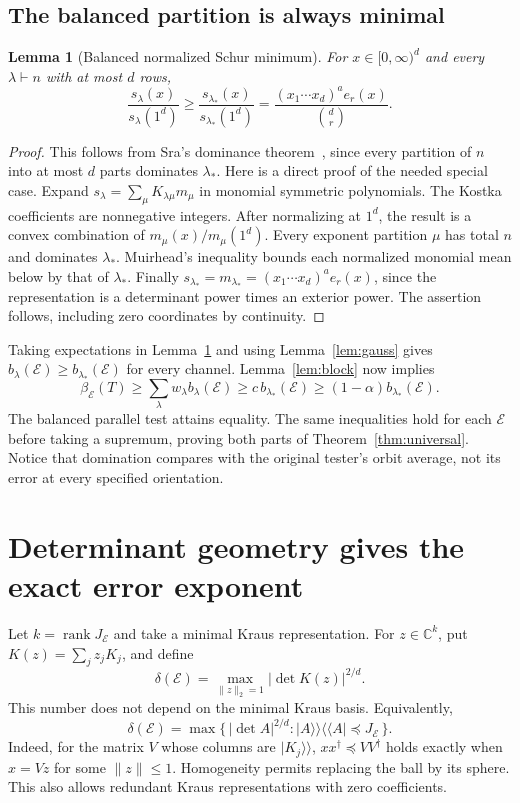 \documentclass[11pt,a4paper]{article}
\newtheorem{lemma}[theorem]{Lemma}
\theoremstyle{remark}\newtheorem{remark}[theorem]{Remark}
\DeclareMathOperator{\rank}{rank}
\newcommand{\E}{\mathcal E}
\newcommand{\CC}{\mathbb C}
\newcommand{\vket}[1]{\lvert #1\rangle\!\rangle}
\newcommand{\vbra}[1]{\langle\!\langle #1\rvert}
\newcommand{\bal}{\lambda_*}
\begin{document}
\subsection{The balanced partition is always minimal}
\begin{lemma}[Balanced normalized Schur minimum]\label{lem:balanced}
For $x\in[0,\infty)^d$ and every $\lambda\vdash n$ with at most $d$ rows,
\begin{equation}
\frac{s_\lambda(x)}{s_\lambda(1^d)}
\ge\frac{s_{\bal}(x)}{s_{\bal}(1^d)}
=\frac{(x_1\cdots x_d)^a e_r(x)}{\binom dr}.
\end{equation}
\end{lemma}
\begin{proof}
This follows from Sra's dominance theorem~\cite{sra}, since every partition of $n$ into at most $d$ parts dominates $\bal$. Here is a direct proof of the needed special case. Expand $s_\lambda=\sum_\mu K_{\lambda\mu}m_\mu$ in monomial symmetric polynomials. The Kostka coefficients are nonnegative integers. After normalizing at $1^d$, the result is a convex combination of $m_\mu(x)/m_\mu(1^d)$. Every exponent partition $\mu$ has total $n$ and dominates $\bal$. Muirhead's inequality bounds each normalized monomial mean below by that of $\bal$. Finally $s_{\bal}=m_{\bal}=(x_1\cdots x_d)^ae_r(x)$, since the representation is a determinant power times an exterior power. The assertion follows, including zero coordinates by continuity.
\end{proof}

Taking expectations in Lemma~\ref{lem:balanced} and using Lemma~\ref{lem:gauss} gives $b_\lambda(\E)\ge b_{\bal}(\E)$ for every channel. Lemma~\ref{lem:block} now implies
\[
\beta_\E(T)\ge\sum_\lambda w_\lambda b_\lambda(\E)
\ge c\,b_{\bal}(\E)\ge(1-\alpha)b_{\bal}(\E).
\]
The balanced parallel test attains equality. The same inequalities hold for each $\E$ before taking a supremum, proving both parts of Theorem~\ref{thm:universal}. Notice that domination compares with the original tester's orbit average, not its error at every specified orientation.

\section{Determinant geometry gives the exact error exponent}
Let $k=\rank J_\E$ and take a minimal Kraus representation. For $z\in\CC^k$, put $K(z)=\sum_jz_jK_j$, and define
\begin{equation}
\delta(\E)=\max_{\|z\|_2=1}|\det K(z)|^{2/d}.
\label{eq:delta}
\end{equation}
This number does not depend on the minimal Kraus basis. Equivalently,
\begin{equation}
\delta(\E)=\max\{\,|\det A|^{2/d}:\vket A\vbra A\preceq J_\E\,\}.
\label{eq:intrinsic}
\end{equation}
Indeed, for the matrix $V$ whose columns are $\vket{K_j}$, $xx^\dagger\preceq VV^\dagger$ holds exactly when $x=Vz$ for some $\|z\|\le1$. Homogeneity permits replacing the ball by its sphere. This also allows redundant Kraus representations with zero coefficients.
\end{document}
